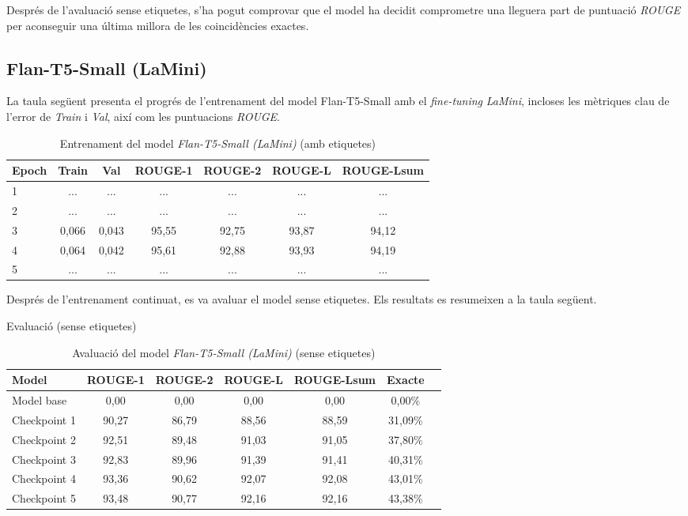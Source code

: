 Després	de l'avaluació sense etiquetes, s'ha pogut comprovar que el model ha decidit comprometre una lleguera part de puntuació \textit{ROUGE} per aconseguir una última millora de les coincidències exactes.



\subsection{Flan-T5-Small (LaMini)}
La taula següent presenta el progrés de l'entrenament del model Flan-T5-Small amb el \textit{fine-tuning} \textit{LaMini}, incloses les mètriques clau de l'error de \textit{Train} i \textit{Val}, així com les puntuacions \textit{ROUGE}.
\begin{table}[H]
    \centering
    \begin{tabular}{lcccccc}
    \toprule
    Epoch & Train & Val & ROUGE-1 & ROUGE-2 & ROUGE-L & ROUGE-Lsum \\
    \midrule
    1 & ... & ... & ... & ... & ... & ... \\
    2 & ... & ... & ... & ... & ... & ... \\
    3 & 0,066 & 0,043 & 95,55 & 92,75 & 93,87 & 94,12 \\
    4 & 0,064 & 0,042 & 95,61 & 92,88 & 93,93 & 94,19 \\
    5 & ... & ... & ... & ... & ... & ... \\
    \bottomrule
    \end{tabular}
    \caption[Entrenament del model \textit{Flan-T5-Small (LaMini)}]{Entrenament del model \textit{Flan-T5-Small (LaMini)} (amb etiquetes)}
\end{table}

Després de l'entrenament continuat, es va avaluar el model sense etiquetes. Els resultats es resumeixen a la taula següent.

\begin{table}[H]
    \centering
    \caption{Evaluació (sense etiquetes)}
    \begin{tabular}{lcccccc}
    \toprule
    Model & ROUGE-1 & ROUGE-2 & ROUGE-L & ROUGE-Lsum & Exacte \\
    \midrule
    Model base   & 0,00  & 0,00  & 0,00  & 0,00  & 0,00\% \\
    Checkpoint 1 & 90,27 & 86,79 & 88,56 & 88,59 & 31,09\% \\
    Checkpoint 2 & 92,51 & 89,48 & 91,03 & 91,05 & 37,80\% \\
    Checkpoint 3 & 92,83 & 89,96 & 91,39 & 91,41 & 40,31\% \\
    Checkpoint 4 & 93,36 & 90,62 & 92,07 & 92,08 & 43,01\% \\
    Checkpoint 5 & 93,48 & 90,77 & 92,16 & 92,16 & 43,38\% \\
    \bottomrule
    \end{tabular}
    \caption[Avaluació del model \textit{Flan-T5-Small (LaMini)}]{Avaluació del model \textit{Flan-T5-Small (LaMini)} (sense etiquetes)}
\end{table}

